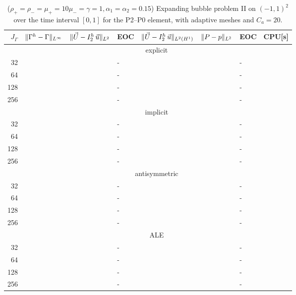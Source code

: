 \begin{table}
\center
\hspace*{-3.25cm}
\begin{tabular}{rllllllr}
\hline
$J_\Gamma$ & $\|\Gamma^h - \Gamma\|_{L^\infty}$ & $\|\vec U - I^h_{2}\,\vec u\|_{L^2}$ & EOC & $\|\vec U - I^h_{2}\,\vec u\|_{L^2(H^1)}$ & $\|P - p\|_{L^2}$ & EOC
& CPU[s] \\
\hline
& \multicolumn{7}{c}{explicit} \\
\hline
 32 & & & - & & & - & \\
 64 & & & - & & & - & \\
128 & & & - & & & - & \\
256 & & & - & & & - & \\
\hline
& \multicolumn{7}{c}{implicit} \\
\hline
 32 & & & - & & & - & \\
 64 & & & - & & & - & \\
128 & & & - & & & - & \\
256 & & & - & & & - & \\
\hline
& \multicolumn{7}{c}{antisymmetric} \\
\hline
 32 & & & - & & & - & \\
 64 & & & - & & & - & \\
128 & & & - & & & - & \\
256 & & & - & & & - & \\
\hline
& \multicolumn{7}{c}{ALE} \\
\hline
 32 & & & - & & & - & \\
 64 & & & - & & & - & \\
128 & & & - & & & - & \\
256 & & & - & & & - & \\
\hline
\end{tabular}
\hspace*{-3.25cm}
\caption[Navier--Stokes expanding bubble II errors P2--P0]
{($\rho_+ = \rho_- = \mu_+ = 10\mu_- = \gamma = 1,\alpha_1=\alpha_2=0.15$)
Expanding bubble problem II on $(-1,1)^2$ over the time interval $[0,1]$ for
the P2--P0 element, with adaptive meshes and $C_a=20$\textdegree.}
\label{tab:nsexpandingbubbleIIp2p0}
\end{table}

